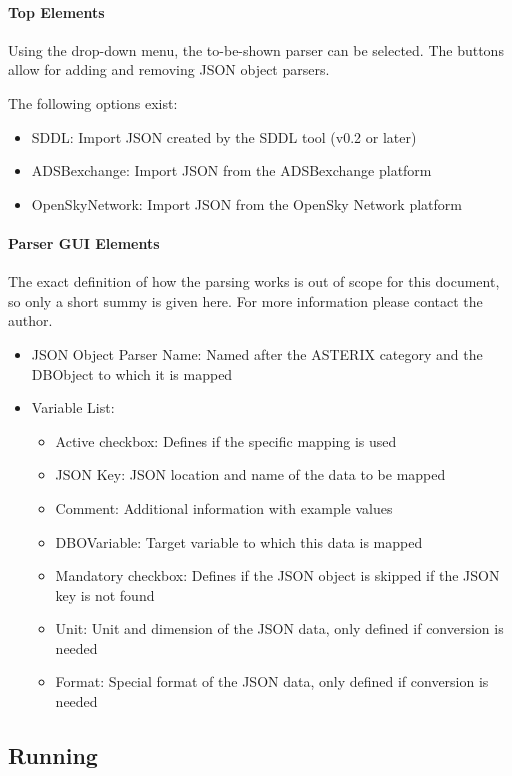 \paragraph{Top Elements}

Using the drop-down menu, the to-be-shown parser can be selected. The buttons allow for adding and removing JSON object parsers.

The following options exist:
\begin{itemize}  
\item SDDL: Import JSON created by the SDDL tool (v0.2 or later)
\item ADSBexchange: Import JSON from the ADSBexchange platform
\item OpenSkyNetwork: Import JSON from the OpenSky Network platform
\end{itemize}

\paragraph{Parser GUI Elements}

The exact definition of how the parsing works is out of scope for this document, so only a short summy is given here. For more information please contact the author.

\begin{itemize}  
\item JSON Object Parser Name: Named after the ASTERIX category and the DBObject to which it is mapped
\item Variable List:
\begin{itemize}  
\item Active checkbox: Defines if the specific mapping is used
\item JSON Key: JSON location and name of the data to be mapped
\item Comment: Additional information with example values
\item DBOVariable: Target variable to which this data is mapped
\item Mandatory checkbox: Defines if the JSON object is skipped if the JSON key is not found
\item Unit: Unit and dimension of the JSON data, only defined if conversion is needed
\item Format: Special format of the JSON data, only defined if conversion is needed
\end{itemize}
\end{itemize}

\subsection{Running}

